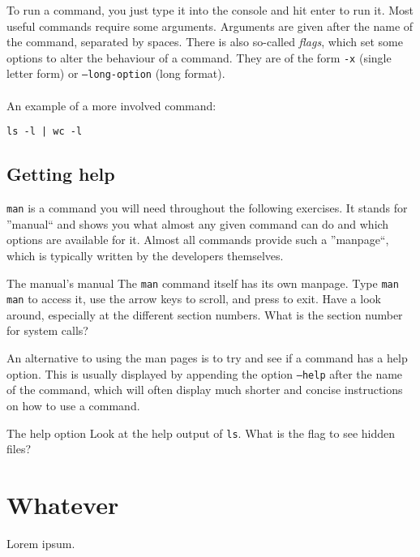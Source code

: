 \documentclass{TheAlternativeCourse}
\begin{document}
To run a command, you just type it into the console and hit enter to run it.
Most useful commands require some arguments. Arguments are given after the name of
the command, separated by spaces. There is also so-called \emph{flags}, which
set some options to alter the behaviour of a command. They are of the form
\texttt{-x} (single letter form) or \texttt{--long-option} (long format). \\\\
%
An example of a more involved command:

\begin{cmdbox}
\texttt{ls -l | wc -l}
\end{cmdbox}

\subsection{Getting help}

\texttt{man} is a command you will need throughout the following
exercises.  It stands for ''manual`` and shows you what almost any given
command can do and which options are available for it.  Almost all commands
provide such a ''manpage``, which is typically written by the developers
themselves. \\
%
\begin{exercisebox}{The manual's manual}
    The \texttt{man} command itself has its own manpage. Type \texttt{man man}
    to access it, use the arrow keys to scroll, and press  to exit.
    Have a look around, especially at the different section numbers.
    What is the section number for system calls?
\end{exercisebox}
%
An alternative to using the man pages is to try and see if a command has a help
option. This is usually displayed by appending the option \texttt{--help} after
the name of the command, which will often display much shorter and concise
instructions
on how to use a command. \\
%
\begin{exercisebox}{The help option}
    Look at the help output of \texttt{ls}. What is the flag to see hidden files?
\end{exercisebox}

\section{Whatever}

Lorem ipsum.
\end{document}
